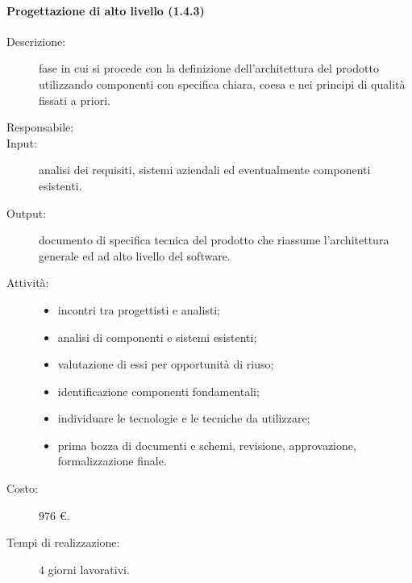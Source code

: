 \paragraph{Progettazione di alto livello (1.4.3)}
\begin{description}
\item[Descrizione:] fase in cui si procede con la definizione dell'architettura del prodotto utilizzando componenti con
specifica chiara, coesa e nei principi di qualità fissati a priori.
\item[Responsabile:] 
\item[Input:] analisi dei requisiti, sistemi aziendali ed eventualmente componenti esistenti.
\item[Output:] documento di specifica tecnica del prodotto che riassume l'architettura generale ed ad
alto livello del software.
\item[Attività:] 
\begin{center}
\begin{itemize}
\item incontri tra progettisti e analisti;
\item analisi di componenti e sistemi esistenti;
\item valutazione di essi per opportunità di riuso;
\item identificazione componenti fondamentali;
\item individuare le tecnologie e le tecniche da utilizzare;
\item prima bozza di documenti e schemi, revisione, approvazione, formalizzazione finale.
\end{itemize}
\end{center}
\item[Costo:] 976 \euro{}.
\item[Tempi di realizzazione:] 4 giorni lavorativi.
\end{description}

